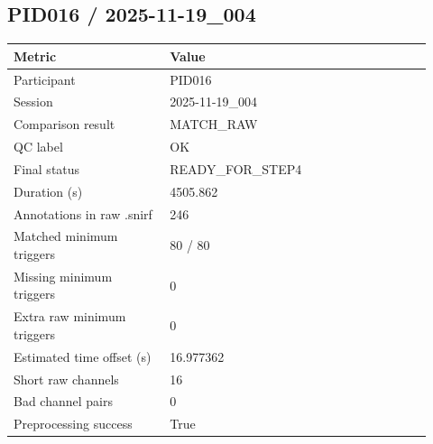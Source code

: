 \subsection*{PID016 / 2025-11-19\_004}
\begin{tabular}{p{0.34\linewidth}p{0.58\linewidth}}
\toprule
Metric & Value\\
\midrule
Participant & PID016\\
Session & 2025-11-19\_004\\
Comparison result & MATCH\_RAW\\
QC label & OK\\
Final status & READY\_FOR\_STEP4\\
Duration (s) & 4505.862\\
Annotations in raw .snirf & 246\\
Matched minimum triggers & 80 / 80\\
Missing minimum triggers & 0\\
Extra raw minimum triggers & 0\\
Estimated time offset (s) & 16.977362\\
Short raw channels & 16\\
Bad channel pairs & 0\\
Preprocessing success & True\\
\bottomrule
\end{tabular}
